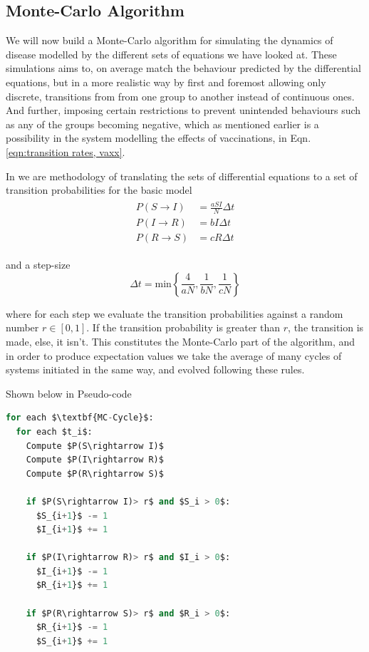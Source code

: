 \documentclass[10pt,showpacs,preprintnumbers,amsmath,amssymb,nofootinbib,aps,prl,twocolumn,groupedaddress,superscriptaddress,showkeys]{revtex4-1}
\begin{document}
  \subsection{Monte-Carlo Algorithm}
    We will now build a Monte-Carlo algorithm for simulating the dynamics of disease modelled by the different sets of equations we have looked at. These simulations aims to, on average match the behaviour predicted by the differential equations, but in a more realistic way by first and foremost allowing only discrete, transitions from from one group to another instead of continuous ones. And further, imposing certain restrictions to prevent unintended behaviours such as any of the groups becoming negative, which as mentioned earlier is a possibility in the system modelling the effects of vaccinations, in Eqn. \ref{eqn:transition rates, vaxx}.

    In \textcite{project5} we are methodology of translating the sets of differential equations to a set of transition probabilities for the basic model
    \begin{align}
      \begin{split}
        P(S\rightarrow I) &= \frac{aSI}{N}\Delta t \\
        P(I\rightarrow R) &= bI\Delta t \\
        P(R\rightarrow S) &= cR\Delta t
        \label{eqn:basic probabilities}
      \end{split}
    \end{align}

    and a step-size
    \begin{equation}
      \Delta t = \text{min}\left\{ \frac{4}{aN}, \frac{1}{bN}, \frac{1}{cN} \right\}
      \label{enq:basic dt}
    \end{equation}

     where for each step we evaluate the transition probabilities against a random number $r\in[0,1]$. If the transition probability is greater than $r$, the transition is made, else, it isn't. This constitutes the Monte-Carlo part of the algorithm, and in order to produce expectation values we take the average of many cycles of systems initiated in the same way, and evolved following these rules. 

     Shown below in Pseudo-code
\begin{lstlisting}[mathescape=true, language=python, title=SIRS Monte-Carlo]
for each $\textbf{MC-Cycle}$:
  for each $t_i$:
    Compute $P(S\rightarrow I)$
    Compute $P(I\rightarrow R)$
    Compute $P(R\rightarrow S)$

    if $P(S\rightarrow I)> r$ and $S_i > 0$:
      $S_{i+1}$ -= 1
      $I_{i+1}$ += 1

    if $P(I\rightarrow R)> r$ and $I_i > 0$:
      $I_{i+1}$ -= 1
      $R_{i+1}$ += 1

    if $P(R\rightarrow S)> r$ and $R_i > 0$:
      $R_{i+1}$ -= 1
      $S_{i+1}$ += 1
\end{lstlisting}
  
\end{document}
